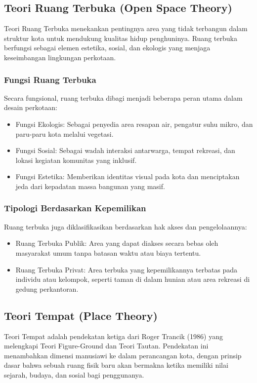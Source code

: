 \documentclass[../rumukota.tex]{subfiles}
\begin{document}
\subsection{Teori Ruang Terbuka (Open Space Theory)}
Teori Ruang Terbuka menekankan pentingnya area yang tidak terbangun dalam struktur kota untuk mendukung kualitas hidup penghuninya. Ruang terbuka berfungsi sebagai elemen estetika, sosial, dan ekologis yang menjaga keseimbangan lingkungan perkotaan.

\subsubsection{Fungsi Ruang Terbuka}
Secara fungsional, ruang terbuka dibagi menjadi beberapa peran utama dalam desain perkotaan:

\begin{itemize}
	\item Fungsi Ekologis: Sebagai penyedia area resapan air, pengatur suhu mikro, dan paru-paru kota melalui vegetasi.
	\item Fungsi Sosial: Sebagai wadah interaksi antarwarga, tempat rekreasi, dan lokasi kegiatan komunitas yang inklusif.
	\item Fungsi Estetika: Memberikan identitas visual pada kota dan menciptakan jeda dari kepadatan massa bangunan yang masif.
\end{itemize}

\subsubsection{Tipologi Berdasarkan Kepemilikan}
Ruang terbuka juga diklasifikasikan berdasarkan hak akses dan pengelolaannya:

\begin{itemize}
	\item Ruang Terbuka Publik: Area yang dapat diakses secara bebas oleh masyarakat umum tanpa batasan waktu atau biaya tertentu.
	\item Ruang Terbuka Privat: Area terbuka yang kepemilikannya terbatas pada individu atau kelompok, seperti taman di dalam hunian atau area rekreasi di gedung perkantoran.
\end{itemize}

\subsection{Teori Tempat (Place Theory)}
Teori Tempat adalah pendekatan ketiga dari Roger Trancik (1986) yang melengkapi Teori Figure-Ground dan Teori Tautan. Pendekatan ini menambahkan dimensi manusiawi ke dalam perancangan kota, dengan prinsip dasar bahwa sebuah ruang fisik baru akan bermakna ketika memiliki nilai sejarah, budaya, dan sosial bagi penggunanya.
\end{document}
